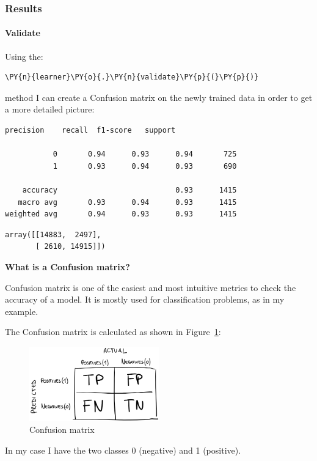 \subsubsection{Results}
\paragraph{Validate}
Using the:
    \begin{tcolorbox}[breakable, size=fbox, boxrule=1pt, pad at break*=1mm,colback=cellbackground, colframe=cellborder]
\begin{Verbatim}[commandchars=\\\{\},fontsize=\footnotesize]
\PY{n}{learner}\PY{o}{.}\PY{n}{validate}\PY{p}{(}\PY{p}{)}
\end{Verbatim}
\end{tcolorbox}method I can create a \gls{Confusion matrix} on the newly trained data in order to get a more detailed picture:
    \begin{Verbatim}[commandchars=\\\{\},fontsize=\footnotesize]
              precision    recall  f1-score   support

           0       0.94      0.93      0.94       725
           1       0.93      0.94      0.93       690

    accuracy                           0.93      1415
   macro avg       0.93      0.94      0.93      1415
weighted avg       0.94      0.93      0.93      1415

    \end{Verbatim}
            \begin{tcolorbox}[breakable, size=fbox, boxrule=.5pt, pad at break*=1mm, opacityfill=0]
\begin{Verbatim}[commandchars=\\\{\},fontsize=\footnotesize]
array([[14883,  2497],
       [ 2610, 14915]])
\end{Verbatim}
\end{tcolorbox}


\textbf{What is a \gls{Confusion matrix}?}

\gls{Confusion matrix} is one of the easiest and most intuitive metrics to check the \gls{accuracy} of a model.
It is mostly used for classification problems, as in my example.

The \gls{Confusion matrix} is calculated as shown in Figure~\ref{fig:fig_cm}:
\begin{figure}[ht!]
\centering
\includegraphics[width=0.5\textwidth]{images/cm.png}
\caption{\gls{Confusion matrix}}
\label{fig:fig_cm}
\end{figure}
\FloatBarrier
In my case I have the two classes 0 (negative) and 1 (positive).

